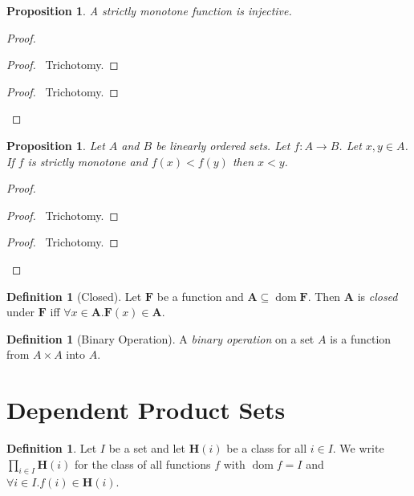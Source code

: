 \documentclass{book}
\let\qed\relax
\newtheorem{prop}[ax]{Proposition}
\theoremstyle{definition}
\newtheorem{df}[ax]{Definition}
\newcommand{\dom}{\ensuremath{\operatorname{dom}}}
\begin{document}
\begin{prop}
A strictly monotone function is injective.
\end{prop}

\begin{proof}
\pf
{}
\begin{proof}
	\pf\ Trichotomy.
\end{proof}
\begin{proof}
	\pf\ Trichotomy.
\end{proof}
\qed
\end{proof}

\begin{prop}
\label{prop:strictmonotoneinv}
Let $A$ and $B$ be linearly ordered sets. Let $f : A \rightarrow B$. Let $x,y \in A$. If $f$ is strictly monotone and $f(x) < f(y)$ then $x < y$.
\end{prop}

\begin{proof}
\pf
{}
\begin{proof}
	\pf\ Trichotomy.
\end{proof}
\begin{proof}
	\pf\ Trichotomy.
\end{proof}
\qed
\end{proof}

\begin{df}[Closed]
Let $\mathbf{F}$ be a function and $\mathbf{A} \subseteq \dom \mathbf{F}$. Then $\mathbf{A}$ is \emph{closed} under $\mathbf{F}$ iff $\forall x \in \mathbf{A}. \mathbf{F}(x) \in \mathbf{A}$.
\end{df}

\begin{df}[Binary Operation]
A \emph{binary operation} on a set $A$ is a function from $A \times A$ into $A$.
\end{df}

\section{Dependent Product Sets}

\begin{df}
Let $I$ be a set and let $\mathbf{H}(i)$ be a class for all $i \in I$. We write $\prod_{i \in I} \mathbf{H}(i)$ for the class of all functions $f$ with $\dom f = I$ and $\forall i \in I. f(i) \in \mathbf{H}(i)$.
\end{df}
\end{document}
